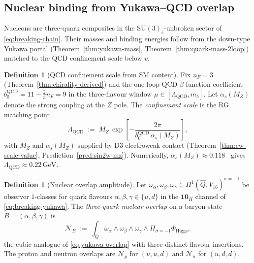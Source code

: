 \documentclass[11pt]{article}
\theoremstyle{plain}
\theoremstyle{definition}
\newtheorem{definition}[theorem]{Definition}
\theoremstyle{remark}
\numberwithin{equation}{section}
\begin{document}
\subsection{Nuclear binding from Yukawa--QCD overlap}
\label{sec:nuclear:binding}

Nucleons are three-quark composites in the $\mathrm{SU}(3)_c$-unbroken sector
of \eqref{eq:breaking-chain}. Their masses and binding energies follow from
the down-type Yukawa portal (Theorem~\ref{thm:yukawa-mass},
Theorem~\ref{thm:quark-mass-2loop}) matched to the QCD confinement scale
below $v$.

\begin{definition}[QCD confinement scale from SM content]
\label{def:lambda-qcd}
Fix $n_F=3$ (Theorem~\ref{thm:chirality-derived}) and the one-loop QCD
$\beta$-function coefficient $b_0^{\mathrm{QCD}}=11-\tfrac{2}{3}n_F=9$ in the
three-flavour window $\mu\in[\Lambda_{\mathrm{QCD}},m_b]$. Let
$\alpha_s(M_Z)$ denote the strong coupling at the $Z$ pole. The
\emph{confinement scale} is the RG matching point
\begin{equation}\label{eq:lambda-qcd}
  \Lambda_{\mathrm{QCD}}
  \;:=\;
  M_Z\,
  \exp\!\left[-\frac{2\pi}{b_0^{\mathrm{QCD}}\,\alpha_s(M_Z)}\right],
\end{equation}
with $M_Z$ and $\alpha_s(M_Z)$ supplied by D3 electroweak contact
(Theorem~\ref{thm:ew-scale-value}, Prediction~\ref{pred:sin2w-mz}). Numerically,
$\alpha_s(M_Z)\approx 0.118$~\cite{PDG2025} gives
$\Lambda_{\mathrm{QCD}}\approx 0.22\,\mathrm{GeV}$.
\end{definition}

\begin{definition}[Nuclear overlap amplitude]\label{def:nuclear-overlap}
Let $\omega_\alpha,\omega_\beta,\omega_\gamma\in
H^1(\hat Q,V_{16})^{\sigma=-1}$ be observer $1$-classes for quark flavours
$\alpha,\beta,\gamma\in\{u,d\}$ in the $\mathbf{10}_H$ channel of
\eqref{eq:breaking-yukawa}. The \emph{three-quark nuclear overlap} on a
baryon state $B=(\alpha,\beta,\gamma)$ is
\begin{equation}\label{eq:nuclear-overlap}
  \mathcal{N}_B
  \;:=\;
  \int_{\hat Q}
  \omega_\alpha\wedge\omega_\beta\wedge\omega_\gamma
  \wedge\Pi_{\sigma=-1}\Phi_{\mathrm{Higgs}},
\end{equation}
the cubic analogue of \eqref{eq:yukawa-overlap} with three distinct flavour
insertions. The proton and neutron overlaps are $\mathcal{N}_p$ for
$(u,u,d)$ and $\mathcal{N}_n$ for $(u,d,d)$.
\end{definition}
\end{document}
